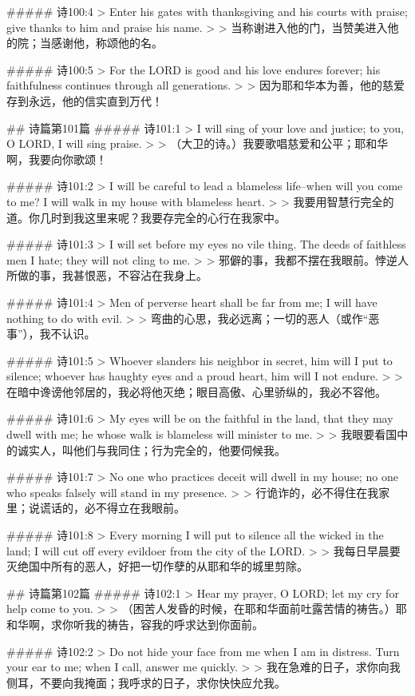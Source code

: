 ##### 诗100:4
> Enter his gates with thanksgiving and his courts with praise; give thanks to him and praise his name.
>
> 当称谢进入他的门，当赞美进入他的院；当感谢他，称颂他的名。


##### 诗100:5
> For the LORD is good and his love endures forever; his faithfulness continues through all generations.
>
> 因为耶和华本为善，他的慈爱存到永远，他的信实直到万代！


## 诗篇第101篇
##### 诗101:1
> I will sing of your love and justice; to you, O LORD, I will sing praise.
>
> （大卫的诗。）我要歌唱慈爱和公平；耶和华啊，我要向你歌颂！


##### 诗101:2
> I will be careful to lead a blameless life--when will you come to me? I will walk in my house with blameless heart.
>
> 我要用智慧行完全的道。你几时到我这里来呢？我要存完全的心行在我家中。


##### 诗101:3
> I will set before my eyes no vile thing. The deeds of faithless men I hate; they will not cling to me.
>
> 邪僻的事，我都不摆在我眼前。悖逆人所做的事，我甚恨恶，不容沾在我身上。


##### 诗101:4
> Men of perverse heart shall be far from me; I will have nothing to do with evil.
>
> 弯曲的心思，我必远离；一切的恶人（或作“恶事”），我不认识。


##### 诗101:5
> Whoever slanders his neighbor in secret, him will I put to silence; whoever has haughty eyes and a proud heart, him will I not endure.
>
> 在暗中谗谤他邻居的，我必将他灭绝；眼目高傲、心里骄纵的，我必不容他。


##### 诗101:6
> My eyes will be on the faithful in the land, that they may dwell with me; he whose walk is blameless will minister to me.
>
> 我眼要看国中的诚实人，叫他们与我同住；行为完全的，他要伺候我。


##### 诗101:7
> No one who practices deceit will dwell in my house; no one who speaks falsely will stand in my presence.
>
> 行诡诈的，必不得住在我家里；说谎话的，必不得立在我眼前。


##### 诗101:8
> Every morning I will put to silence all the wicked in the land; I will cut off every evildoer from the city of the LORD.
>
> 我每日早晨要灭绝国中所有的恶人，好把一切作孽的从耶和华的城里剪除。


## 诗篇第102篇
##### 诗102:1
> Hear my prayer, O LORD; let my cry for help come to you.
>
> （困苦人发昏的时候，在耶和华面前吐露苦情的祷告。）耶和华啊，求你听我的祷告，容我的呼求达到你面前。


##### 诗102:2
> Do not hide your face from me when I am in distress. Turn your ear to me; when I call, answer me quickly.
>
> 我在急难的日子，求你向我侧耳，不要向我掩面；我呼求的日子，求你快快应允我。


